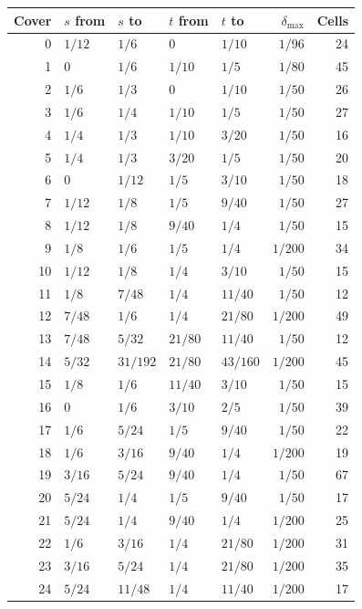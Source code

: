 \begin{table}[ht]
\centering\small
\begin{tabular}{rllllrr}
  \toprule
  Cover & $s$ from & $s$ to & $t$ from & $t$ to & $\delta_{\max}$ & Cells\\
  \midrule
  0 & $1/12$ & $1/6$ & $0$ & $1/10$ & $1/96$ & 24\\
  1 & $0$ & $1/6$ & $1/10$ & $1/5$ & $1/80$ & 45\\
  2 & $1/6$ & $1/3$ & $0$ & $1/10$ & $1/50$ & 26\\
  3 & $1/6$ & $1/4$ & $1/10$ & $1/5$ & $1/50$ & 27\\
  4 & $1/4$ & $1/3$ & $1/10$ & $3/20$ & $1/50$ & 16\\
  5 & $1/4$ & $1/3$ & $3/20$ & $1/5$ & $1/50$ & 20\\
  6 & $0$ & $1/12$ & $1/5$ & $3/10$ & $1/50$ & 18\\
  7 & $1/12$ & $1/8$ & $1/5$ & $9/40$ & $1/50$ & 27\\
  8 & $1/12$ & $1/8$ & $9/40$ & $1/4$ & $1/50$ & 15\\
  9 & $1/8$ & $1/6$ & $1/5$ & $1/4$ & $1/200$ & 34\\
  10 & $1/12$ & $1/8$ & $1/4$ & $3/10$ & $1/50$ & 15\\
  11 & $1/8$ & $7/48$ & $1/4$ & $11/40$ & $1/50$ & 12\\
  12 & $7/48$ & $1/6$ & $1/4$ & $21/80$ & $1/200$ & 49\\
  13 & $7/48$ & $5/32$ & $21/80$ & $11/40$ & $1/50$ & 12\\
  14 & $5/32$ & $31/192$ & $21/80$ & $43/160$ & $1/200$ & 45\\
  15 & $1/8$ & $1/6$ & $11/40$ & $3/10$ & $1/50$ & 15\\
  16 & $0$ & $1/6$ & $3/10$ & $2/5$ & $1/50$ & 39\\
  17 & $1/6$ & $5/24$ & $1/5$ & $9/40$ & $1/50$ & 22\\
  18 & $1/6$ & $3/16$ & $9/40$ & $1/4$ & $1/200$ & 19\\
  19 & $3/16$ & $5/24$ & $9/40$ & $1/4$ & $1/50$ & 67\\
  20 & $5/24$ & $1/4$ & $1/5$ & $9/40$ & $1/50$ & 17\\
  21 & $5/24$ & $1/4$ & $9/40$ & $1/4$ & $1/200$ & 25\\
  22 & $1/6$ & $3/16$ & $1/4$ & $21/80$ & $1/200$ & 31\\
  23 & $3/16$ & $5/24$ & $1/4$ & $21/80$ & $1/200$ & 35\\
  24 & $5/24$ & $11/48$ & $1/4$ & $11/40$ & $1/200$ & 17\\

\end{tabular}
\end{table}
